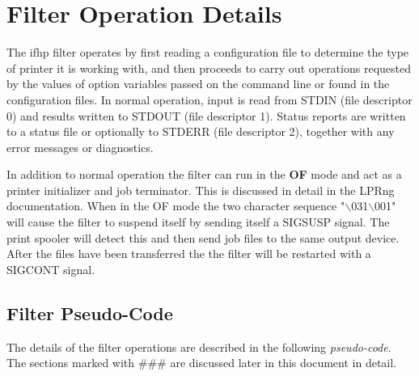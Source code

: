 \documentclass[a4paper]{article}
\begin{document}
\section{Filter Operation Details
\label{read_write}
\label{details}}

The
{\ttfamily ifhp}
filter operates by first reading a configuration file
to determine the type of printer it is working with,
and then proceeds to carry out operations requested by the values of
option variables passed on the command line or found in the configuration
files.
In normal operation,
input is read from 
{\ttfamily STDIN}
(file descriptor 0)
and results written to
{\ttfamily STDOUT} (file descriptor 1).
Status reports are written to
a status file or optionally to
{\ttfamily STDERR} (file descriptor 2),
together with any error messages or diagnostics.

In addition to normal operation
the filter can run in the
{\bfseries OF} mode and act as a printer initializer and job terminator.
This is discussed in detail in the LPRng documentation.
When in the OF mode
the two character sequence {\ttfamily "$\backslash$031$\backslash$001"}
will cause the filter to suspend itself by sending itself a {\ttfamily SIGSUSP}
signal.
The print spooler will detect this and then
send job files to the same output device.
After the files have been transferred the
the filter will be restarted with a SIGCONT signal.


\subsection{Filter Pseudo-Code}

The details of the filter operations are 
described in the following
{\itshape pseudo-code\/}.
The sections marked with {\ttfamily \#\#\#} are discussed later in this document
in detail.
\end{document}
